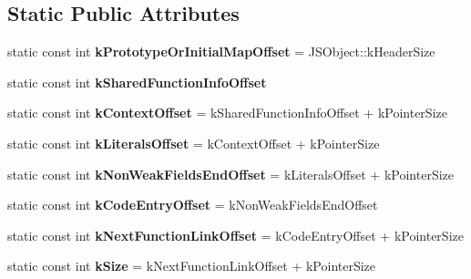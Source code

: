 \subsection*{Static Public Attributes}
\begin{DoxyCompactItemize}
\item 
static const int {\bfseries k\+Prototype\+Or\+Initial\+Map\+Offset} = J\+S\+Object\+::k\+Header\+Size\hypertarget{classv8_1_1internal_1_1_j_s_function_afeab7ef9302f5f8506f76661d07b0a88}{}\label{classv8_1_1internal_1_1_j_s_function_afeab7ef9302f5f8506f76661d07b0a88}

\item 
static const int {\bfseries k\+Shared\+Function\+Info\+Offset}
\item 
static const int {\bfseries k\+Context\+Offset} = k\+Shared\+Function\+Info\+Offset + k\+Pointer\+Size\hypertarget{classv8_1_1internal_1_1_j_s_function_ade0e7f9373960a4a7b06e51844f26b3e}{}\label{classv8_1_1internal_1_1_j_s_function_ade0e7f9373960a4a7b06e51844f26b3e}

\item 
static const int {\bfseries k\+Literals\+Offset} = k\+Context\+Offset + k\+Pointer\+Size\hypertarget{classv8_1_1internal_1_1_j_s_function_af655e87ac2a3d32ffcb06f07280025e7}{}\label{classv8_1_1internal_1_1_j_s_function_af655e87ac2a3d32ffcb06f07280025e7}

\item 
static const int {\bfseries k\+Non\+Weak\+Fields\+End\+Offset} = k\+Literals\+Offset + k\+Pointer\+Size\hypertarget{classv8_1_1internal_1_1_j_s_function_a9264dbf979bcf14612c05ea1508773d1}{}\label{classv8_1_1internal_1_1_j_s_function_a9264dbf979bcf14612c05ea1508773d1}

\item 
static const int {\bfseries k\+Code\+Entry\+Offset} = k\+Non\+Weak\+Fields\+End\+Offset\hypertarget{classv8_1_1internal_1_1_j_s_function_afe3d93b66114f229c8738d1125b5eb6a}{}\label{classv8_1_1internal_1_1_j_s_function_afe3d93b66114f229c8738d1125b5eb6a}

\item 
static const int {\bfseries k\+Next\+Function\+Link\+Offset} = k\+Code\+Entry\+Offset + k\+Pointer\+Size\hypertarget{classv8_1_1internal_1_1_j_s_function_a3b9c13402e2134ff257198c674897154}{}\label{classv8_1_1internal_1_1_j_s_function_a3b9c13402e2134ff257198c674897154}

\item 
static const int {\bfseries k\+Size} = k\+Next\+Function\+Link\+Offset + k\+Pointer\+Size\hypertarget{classv8_1_1internal_1_1_j_s_function_a808203d26f81e54fca0c7c039785fbfa}{}\label{classv8_1_1internal_1_1_j_s_function_a808203d26f81e54fca0c7c039785fbfa}

\end{DoxyCompactItemize}
